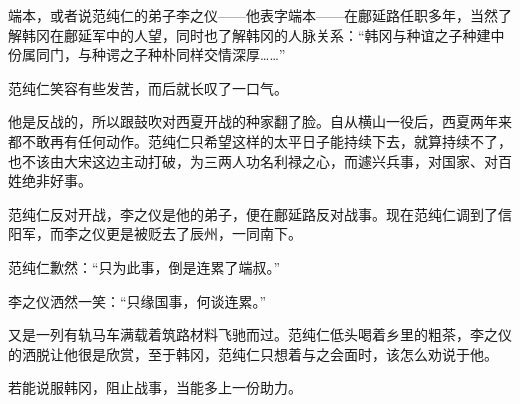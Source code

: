 端本，或者说范纯仁的弟子李之仪——他表字端本——在鄜延路任职多年，当然了解韩冈在鄜延军中的人望，同时也了解韩冈的人脉关系：“韩冈与种谊之子种建中份属同门，与种谔之子种朴同样交情深厚……”

范纯仁笑容有些发苦，而后就长叹了一口气。

他是反战的，所以跟鼓吹对西夏开战的种家翻了脸。自从横山一役后，西夏两年来都不敢再有任何动作。范纯仁只希望这样的太平日子能持续下去，就算持续不了，也不该由大宋这边主动打破，为三两人功名利禄之心，而遽兴兵事，对国家、对百姓绝非好事。

范纯仁反对开战，李之仪是他的弟子，便在鄜延路反对战事。现在范纯仁调到了信阳军，而李之仪更是被贬去了辰州，一同南下。

范纯仁歉然：“只为此事，倒是连累了端叔。”

李之仪洒然一笑：“只缘国事，何谈连累。”

又是一列有轨马车满载着筑路材料飞驰而过。范纯仁低头喝着乡里的粗茶，李之仪的洒脱让他很是欣赏，至于韩冈，范纯仁只想着与之会面时，该怎么劝说于他。

若能说服韩冈，阻止战事，当能多上一份助力。

